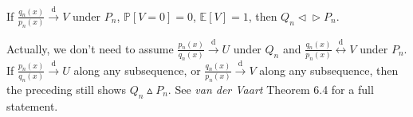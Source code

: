 \documentclass[a4paper]{article}
\begin{document}
\begin{note}
	If $\frac{q_n(x)}{p_n(x)} \stackrel{\text{d}}{\longrightarrow} V$ under $P_n$, $\mathbb{P}[V = 0] = 0$, $\mathbb{E}[V] = 1$, then $Q_n \vartriangleleft \vartriangleright P_n$. 
\end{note}

\begin{remark}
	Actually, we don't need to assume $\frac{p_n(x)}{q_n(x)} \stackrel{\text{d}}{\longrightarrow} U$ under $Q_n$ and $\frac{q_n(x)}{p_n(x)} \stackrel{\text{d}}{\longleftrightarrow} V$ under $P_n$. If $\frac{p_n(x)}{q_n(x)} \stackrel{\text{d}}{\longrightarrow} U$ along any subsequence, or $\frac{q_n(x)}{p_n(x)} \stackrel{\text{d}}{\longrightarrow} V$ along any subsequence, then the preceding still shows $Q_n \vartriangle P_n$. See \emph{van der Vaart} Theorem 6.4 for a full statement.
\end{remark}
\end{document}
